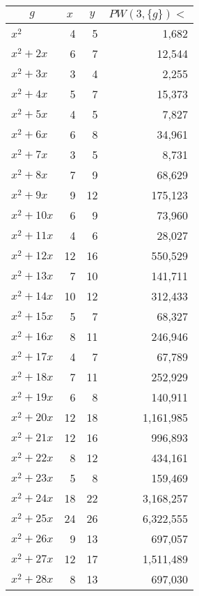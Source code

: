 \documentclass[a4paper]{amsproc}
\theoremstyle{plain}
\begin{document}
\begin{longtable}{ | l | r | r | r | }
\hline

\multicolumn{1}{|c|}{$g$} &
\multicolumn{1}{|c|}{$x$} &
\multicolumn{1}{|c|}{$y$} &
\multicolumn{1}{|c|}{$PW(3, \{g\}) <$} \\ \hline
\endhead


$x^2$ & 4 & 5 & 1{,}682 \\ \hline
$x^2 + 2x$ & 6 & 7 & 12{,}544 \\ \hline
$x^2 + 3x$ & 3 & 4 & 2{,}255 \\ \hline
$x^2 + 4x$ & 5 & 7 & 15{,}373 \\ \hline
$x^2 + 5x$ & 4 & 5 & 7{,}827 \\ \hline
$x^2 + 6x$ & 6 & 8 & 34{,}961 \\ \hline
$x^2 + 7x$ & 3 & 5 & 8{,}731 \\ \hline
$x^2 + 8x$ & 7 & 9 & 68{,}629 \\ \hline
$x^2 + 9x$ & 9 & 12 & 175{,}123 \\ \hline
$x^2 + 10x$ & 6 & 9 & 73{,}960 \\ \hline
$x^2 + 11x$ & 4 & 6 & 28{,}027 \\ \hline
$x^2 + 12x$ & 12 & 16 & 550{,}529 \\ \hline
$x^2 + 13x$ & 7 & 10 & 141{,}711 \\ \hline
$x^2 + 14x$ & 10 & 12 & 312{,}433 \\ \hline
$x^2 + 15x$ & 5 & 7 & 68{,}327 \\ \hline
$x^2 + 16x$ & 8 & 11 & 246{,}946 \\ \hline
$x^2 + 17x$ & 4 & 7 & 67{,}789 \\ \hline
$x^2 + 18x$ & 7 & 11 & 252{,}929 \\ \hline
$x^2 + 19x$ & 6 & 8 & 140{,}911 \\ \hline
$x^2 + 20x$ & 12 & 18 & 1{,}161{,}985 \\ \hline
$x^2 + 21x$ & 12 & 16 & 996{,}893 \\ \hline
$x^2 + 22x$ & 8 & 12 & 434{,}161 \\ \hline
$x^2 + 23x$ & 5 & 8 & 159{,}469 \\ \hline
$x^2 + 24x$ & 18 & 22 & 3{,}168{,}257 \\ \hline
$x^2 + 25x$ & 24 & 26 & 6{,}322{,}555 \\ \hline
$x^2 + 26x$ & 9 & 13 & 697{,}057 \\ \hline
$x^2 + 27x$ & 12 & 17 & 1{,}511{,}489 \\ \hline
$x^2 + 28x$ & 8 & 13 & 697{,}030 \\ \hline

\end{longtable}
\end{document}
